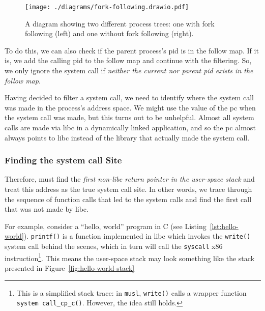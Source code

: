 \begin{figure}[ht]
    \centering
    \texttt{[image: ./diagrams/fork-following.drawio.pdf]} 
    \caption{A diagram showing two different process trees: one with fork
    following (left) and one without fork following (right).}
    \label{fig:fork-follow-process-tree}
\end{figure}


To do this, we can also check if the parent process's \ac{pid} is in the follow
map. If it is, we add the calling \ac{pid} to the follow map and continue with
the filtering. So, we only ignore the system call if \textit{neither the current nor
parent \ac{pid} exists in the follow map}.

Having decided to filter a system call, we need to identify where the system call was made in the process's
address space. We might use the value of the \ac{pc} when
the system call was made, but this turns out to be unhelpful.
Almost all system calls are made via \ac{libc} in a dynamically linked 
application, and so the \ac{pc} almost always points to \ac{libc} instead of the
library that actually made the system call.

\subsubsection{Finding the system call Site}\label{subsubsec:find_syscall}

Therefore, \af must find the \textit{first non-\ac{libc} return pointer in the
user-space stack} and treat this address as the true system call site. In other
words, we trace through the sequence of function calls that led to the system
calls and find the first call that was not made by libc.

For example, consider a ``hello, world'' program in C (see Listing~\ref{lst:hello-world}). \texttt{printf()} is a 
function implemented in \ac{libc} which invokes the \texttt{write()} system call
behind the scenes, which in turn will call the \texttt{syscall} x86
instruction\footnote{This is a simplified stack trace: in \texttt{musl},
\texttt{write()} calls a wrapper function \texttt{system call\_cp\_c()}. However,
the idea still holds.}. This means the user-space stack may look something like the stack
presented in Figure~\ref{fig:hello-world-stack}


